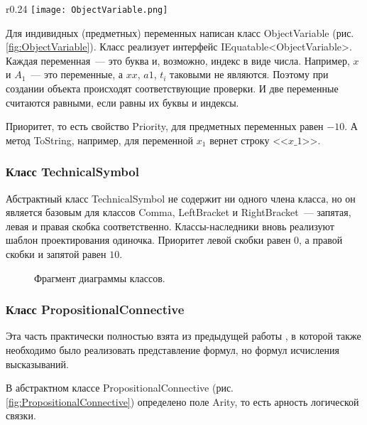 \begin{wrapfigure}{r}{0.24\textwidth}
    \vspace{-1.5cm}
    \texttt{[image: ObjectVariable.png]} 
    \vspace{-0.3cm}
    \caption{}
    \label{fig:ObjectVariable}
\end{wrapfigure}

Для индивидных (предметных) переменных написан класс ObjectVariable (рис. \ref{fig:ObjectVariable}). Класс реализует интерфейс IEquatable<ObjectVariable>. Каждая переменная~--- это буква и, возможно, индекс в виде числа. Например, $x$ и $A_1$~--- это переменные, а $xx$, $a1$, $t_i$ таковыми не являются. Поэтому при создании объекта происходят соответствующие проверки. И две переменные считаются равными, если равны их буквы и индексы.

Приоритет, то есть свойство Priority, для предметных переменных равен $-10$. А метод ToString, например, для переменной $x_1$ вернет строку <<$x\_ 1$>>. 

\subsubsection{Класс TechnicalSymbol}

Абстрактный класс TechnicalSymbol не содержит ни одного члена класса, но он является базовым для классов Comma, LeftBracket и RightBracket~--- запятая, левая и правая скобка соответственно. Классы-наследники вновь реализуют шаблон проектирования одиночка. Приоритет левой скобки равен $0$, а правой скобки и запятой равен $10$.

\begin{figure}[h]
    \caption{Фрагмент диаграммы классов.}
    \label{fig:TechnicalSymbol}
\end{figure}

\subsubsection{Класс PropositionalConnective}

Эта часть практически полностью взята из предыдущей работы \cite{Gibadulin1}, в которой также необходимо было реализовать представление формул, но формул исчисления высказываний. 

В абстрактном классе PropositionalConnective (рис. \ref{fig:PropositionalConnective}) определено поле Arity, то есть арность логической связки.

